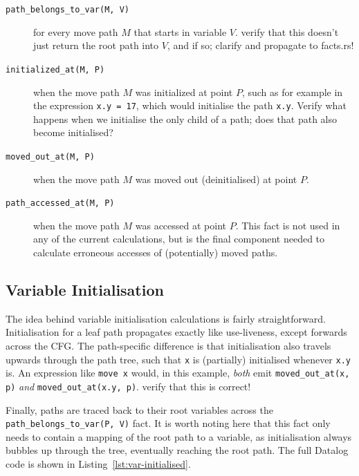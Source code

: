 \documentclass[11pt,a4paper,twoside,openany]{report}
\newcommand{\fixme}[1] {{\color{red}#1}}
\newcommand{\InRust}[1]{\texttt{#1}}
\newcommand{\InDatalog}[1]{\texttt{#1}}
\begin{document}
\begin{description}
\item[\InDatalog{path_belongs_to_var(M, V)}] for every move path $M$ that starts
  in variable $V$. \fixme{verify that this doesn't just return the root path
    into $V$, and if so; clarify and propagate to facts.rs!}

\item[\InDatalog{initialized_at(M, P)}] when the move path $M$ was initialized
  at point $P$, such as for example in the expression \InRust{x.y = 17}, which would
  initialise the path \InRust{x.y}. \fixme{Verify what happens when we
    initialise the only child of a path; does that path also become initialised?}

\item[\InDatalog{moved_out_at(M, P)}] when the move path $M$ was moved out
  (deinitialised) at point $P$.

\item[\InDatalog{path_accessed_at(M, P)}] when the move path $M$ was accessed at
  point $P$. This fact is not used in any of the current calculations, but is
  the final component needed to calculate erroneous accesses of (potentially)
  moved paths.  
\end{description}

\subsection{Variable Initialisation}
\label{sec:var-initalisation}

The idea behind variable initialisation calculations is fairly straightforward.
Initialisation for a leaf path propagates exactly like use-liveness, except
forwards across the CFG. The path-specific difference is that initialisation
also travels upwards through the path tree, such that \InRust{x} is (partially)
initialised whenever \InRust{x.y} is. An expression like \InRust{move x} would,
in this example, \emph{both} emit \InDatalog{moved_out_at(x, p)} \emph{and}
\InDatalog{moved_out_at(x.y, p)}. \fixme{verify that this is correct!}

Finally, paths are traced back to their root variables across the
\InDatalog{path_belongs_to_var(P, V)} fact. It is worth noting here that this
fact only needs to contain a mapping of the root path to a variable, as
initialisation always bubbles up through the tree, eventually reaching the root
path. The full Datalog code is shown in Listing~\ref{lst:var-initialised}.
\end{document}
